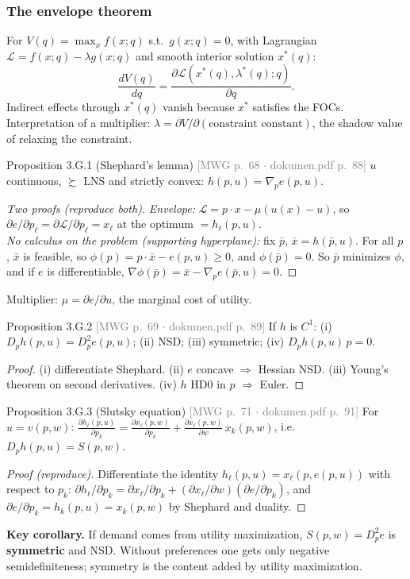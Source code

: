 \documentclass[11pt]{article}
\newcommand{\pref}{\succsim}
\newcommand{\mwg}[2]{\hfill{\small\textcolor{gray}{[MWG p.~#1 $\cdot$ dokumen.pdf p.~#2]}}}
\begin{document}
\subsubsection{The envelope theorem}\label{sec:envelope}
For $V(q)=\max_x f(x;q)$ s.t.\ $g(x;q)=0$, with Lagrangian $\mathcal{L}=f(x;q)-\lambda g(x;q)$ and smooth interior solution $x^*(q)$:
\[
\frac{dV(q)}{dq}=\frac{\partial\mathcal{L}(x^*(q),\lambda^*(q);q)}{\partial q}.
\]
Indirect effects through $x^*(q)$ vanish because $x^*$ satisfies the FOCs. Interpretation of a multiplier: $\lambda=\partial V/\partial(\text{constraint constant})$, the shadow value of relaxing the constraint.

\begin{prop}{Proposition 3.G.1 (Shephard's lemma) \mwg{68}{88}}
$u$ continuous, $\pref$ LNS and strictly convex: $h(p,u)=\nabla_p e(p,u)$.
\end{prop}
\begin{proof}[Two proofs (reproduce both)]
\emph{Envelope:} $\mathcal{L}=p\cdot x-\mu(u(x)-u)$, so $\partial e/\partial p_\ell=\partial\mathcal{L}/\partial p_\ell=x_\ell$ at the optimum $=h_\ell(p,u)$.\\
\emph{No calculus on the problem (supporting hyperplane):} fix $\bar p$, $\bar x=h(\bar p,u)$. For all $p$, $\bar x$ is feasible, so $\phi(p)=p\cdot\bar x-e(p,u)\ge0$, and $\phi(\bar p)=0$. So $\bar p$ minimizes $\phi$, and if $e$ is differentiable, $\nabla\phi(\bar p)=\bar x-\nabla_pe(\bar p,u)=0$.
\end{proof}
Multiplier: $\mu=\partial e/\partial u$, the marginal cost of utility.

\begin{prop}{Proposition 3.G.2 \mwg{69}{89}}
If $h$ is $C^1$: (i) $D_ph(p,u)=D_p^2e(p,u)$; (ii) NSD; (iii) symmetric; (iv) $D_ph(p,u)\,p=0$.
\end{prop}
\begin{proof}[Proof]
(i) differentiate Shephard. (ii) $e$ concave $\Rightarrow$ Hessian NSD. (iii) Young's theorem on second derivatives. (iv) $h$ HD0 in $p$ $\Rightarrow$ Euler.
\end{proof}

\begin{prop}{Proposition 3.G.3 (Slutsky equation) \mwg{71}{91}}
For $u=v(p,w)$: $\displaystyle\frac{\partial h_\ell(p,u)}{\partial p_k}=\frac{\partial x_\ell(p,w)}{\partial p_k}+\frac{\partial x_\ell(p,w)}{\partial w}\,x_k(p,w)$, i.e.\ $D_ph(p,u)=S(p,w)$.
\end{prop}
\begin{proof}[Proof (reproduce)]
Differentiate the identity $h_\ell(p,u)=x_\ell(p,e(p,u))$ with respect to $p_k$:
$\partial h_\ell/\partial p_k=\partial x_\ell/\partial p_k+(\partial x_\ell/\partial w)(\partial e/\partial p_k)$, and $\partial e/\partial p_k=h_k(p,u)=x_k(p,w)$ by Shephard and duality.
\end{proof}
\textbf{Key corollary.} If demand comes from utility maximization, $S(p,w)=D_p^2e$ is \textbf{symmetric} and NSD. Without preferences one gets only negative semidefiniteness; symmetry is the content added by utility maximization.
\end{document}
